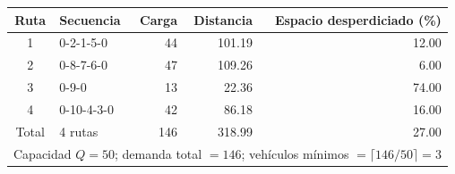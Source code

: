 \begin{tabular}{clrrr}
\toprule
Ruta & Secuencia & Carga & Distancia & Espacio desperdiciado (\%) \\
\midrule
1 & 0-2-1-5-0 & 44 & 101.19 & 12.00 \\
2 & 0-8-7-6-0 & 47 & 109.26 & 6.00 \\
3 & 0-9-0 & 13 & 22.36 & 74.00 \\
4 & 0-10-4-3-0 & 42 & 86.18 & 16.00 \\
\midrule
Total & 4 rutas & 146 & 318.99 & 27.00 \\
\midrule
\multicolumn{5}{l}{Capacidad $Q=50$; demanda total $=146$; vehículos mínimos $=\lceil 146/50 \rceil = 3$} \\
\bottomrule
\end{tabular}
